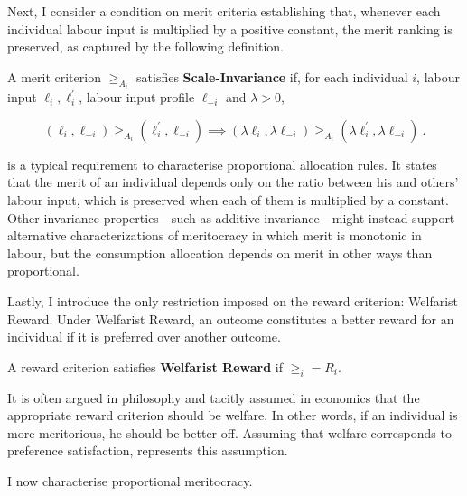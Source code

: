 Next, I consider a condition on merit criteria establishing that, whenever each individual labour input is multiplied by a positive constant, the merit ranking is preserved, as captured by the following definition.

\begin{definition}
	\label{def:scale}
	A merit criterion \( \geq_{A_i} \) satisfies \textbf{Scale-Invariance} if, for each individual \( i \), labour input \( \ell_i, \ell^{\prime}_{i} \), labour input profile \( \ell_{-i} \) and \( \lambda > 0 \),

	\[ ( \ell_i, \ell_{-i} ) \geq_{A_i} ( \ell^{\prime}_i, \ell_{-i} ) \implies ( \lambda \ell_i, \lambda \ell_{-i} ) \geq_{A_i} ( \lambda \ell^{\prime}_i, \lambda \ell_{-i} ) \: .\]
\end{definition}

 is a typical requirement to characterise proportional allocation rules. It states that the merit of an individual depends only on the ratio between his and others' labour input, which is preserved when each of them is multiplied by a constant. Other invariance properties—such as additive invariance—might instead support alternative characterizations of meritocracy in which merit is monotonic in labour, but the consumption allocation depends on merit in other ways than proportional.

Lastly, I introduce the only restriction imposed on the reward criterion: Welfarist Reward. Under Welfarist Reward, an outcome constitutes a better reward for an individual if it is preferred over another outcome.

\begin{definition}\label{def:welfrew}
	A reward criterion satisfies \textbf{Welfarist Reward} if \( \geq_i = R_i \).
\end{definition}

It is often argued in philosophy \citep{arnesonDesertEquality2007,kaganGeometryDesert2014} and tacitly assumed in economics that the appropriate reward criterion should be welfare. In other words, if an individual is more meritorious, he should be better off. Assuming that welfare corresponds to preference satisfaction,  represents this assumption.

I now characterise proportional meritocracy.

